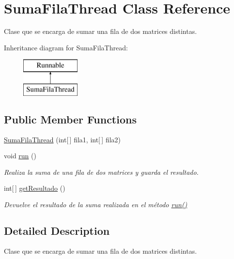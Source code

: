 \hypertarget{classSumaFilaThread}{\section{Suma\-Fila\-Thread Class Reference}
\label{classSumaFilaThread}
}


Clase que se encarga de sumar una fila de dos matrices distintas.  


Inheritance diagram for Suma\-Fila\-Thread\-:\begin{figure}[H]
\begin{center}
\leavevmode
\includegraphics[height=2.000000cm]{classSumaFilaThread}
\end{center}
\end{figure}
\subsection*{Public Member Functions}
\begin{DoxyCompactItemize}
\item 
\hyperlink{classSumaFilaThread_a08b98e8d93693ed9f256529ab12af18f}{Suma\-Fila\-Thread} (int\mbox{[}$\,$\mbox{]} fila1, int\mbox{[}$\,$\mbox{]} fila2)
\item 
void \hyperlink{classSumaFilaThread_ad8fa946cd44e708f69cd98b3ec4c824e}{run} ()
\begin{DoxyCompactList}\small\item\em Realiza la suma de una fila de dos matrices y guarda el resultado. \end{DoxyCompactList}\item 
int\mbox{[}$\,$\mbox{]} \hyperlink{classSumaFilaThread_a6a2181a1a49bd2ef1169e3467b670e9f}{get\-Resultado} ()
\begin{DoxyCompactList}\small\item\em Devuelve el resultado de la suma realizada en el método \hyperlink{classSumaFilaThread_ad8fa946cd44e708f69cd98b3ec4c824e}{run()} \end{DoxyCompactList}\end{DoxyCompactItemize}


\subsection{Detailed Description}
Clase que se encarga de sumar una fila de dos matrices distintas. 


